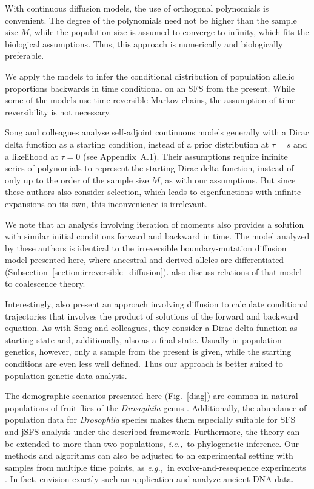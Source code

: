 \documentclass[preprint]{elsarticle}
\newcommand\eg{{\it e.g.,}}
\newcommand\ie{{\it i.e.,}}
\begin{document}
With continuous diffusion models, the use of orthogonal polynomials is convenient. The degree of the polynomials need not be higher than the sample size $M$, while the population size is assumed to converge to infinity, which fits the biological assumptions. Thus, this approach is numerically and biologically preferable. 

We apply the models to infer the conditional distribution of population allelic proportions backwards in time conditional on an SFS from the present. While some of the models use time-reversible Markov chains, the assumption of time-reversibility is not necessary.%

Song and colleagues \citep{Song12,Stei13,Stei14,Zivk15} analyse self-adjoint continuous models generally with a Dirac delta function as a starting condition, instead of a prior distribution at $\tau=s$ and a likelihood at $\tau=0$ (see Appendix~A.1). Their assumptions require infinite series of polynomials to represent the starting Dirac delta function, instead of only up to the order of the sample size $M$, as with our assumptions. But since these authors also consider selection, which leads to eigenfunctions with infinite expansions on its own, this inconvenience is irrelevant. 

We note that an analysis involving iteration of moments \citep{Evan07,Zivk11} also provides a solution with similar initial conditions forward and backward in time. The model analyzed by these authors is identical to the irreversible boundary-mutation diffusion model presented here, where ancestral and derived alleles are differentiated (Subsection~\ref{section:irreversible_diffusion}). \citet{Zivk11} also discuss relations of that model to coalescence theory. 

Interestingly, \citet{Zhao13} also present an approach involving diffusion to calculate conditional trajectories that involves the product of solutions of the forward and backward equation. As with Song and colleagues, they consider a Dirac delta function as starting state and, additionally, also as a final state. Usually in population genetics, however, only a sample from the present is given, while the starting conditions are even less well defined. Thus our approach is better suited to population genetic data analysis. 

The demographic scenarios presented here (Fig.~\ref{diag}) are common in natural populations of fruit flies of the \textit{Drosophila} genus \citep[\eg][]{Li06,Zeng10a,Pool12}. Additionally, the abundance of population data for \textit{Drosophila} species makes them especially suitable for SFS and jSFS analysis under the described framework. Furthermore, the theory can be extended to more than two populations, \ie\ to phylogenetic inference. Our methods and algorithms can also be adjusted to an experimental setting with samples from multiple time points, as \eg\ in evolve-and-resequence experiments \citep{Kofl14}. In fact, \citet{Stei14} envision exactly such an application and analyze ancient DNA data. 
\end{document}
